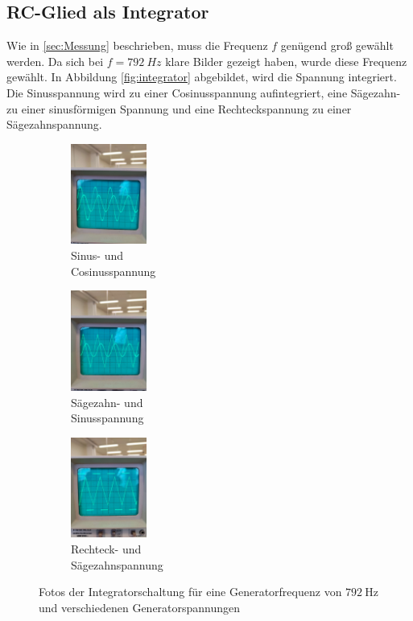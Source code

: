 \subsection{RC-Glied als Integrator}
Wie in \autoref{sec:Messung} beschrieben, muss die Frequenz $f$ genügend groß gewählt werden. Da sich bei $f = \SI{792}{Hz}$ klare Bilder gezeigt haben, wurde diese 
Frequenz gewählt. 
In Abbildung \autoref{fig:integrator} abgebildet, wird die Spannung integriert. Die Sinusspannung wird zu einer Cosinusspannung aufintegriert, eine Sägezahn- zu einer 
sinusförmigen Spannung und eine Rechteckspannung zu einer Sägezahnspannung.

\begin{figure}
    \centering
    \begin{subfigure}{0.3\textwidth}
        \centering
        \includegraphics[height=3.3cm]{img/sinus.jpg}
        \caption{Sinus- und \\ Cosinusspannung}
        \label{fig:sinus}
    \end{subfigure}
    \begin{subfigure}{0.3\textwidth}
        \centering
        \includegraphics[height=3.3cm]{img/saegezahn.jpg}
        \caption{Sägezahn- und \\ Sinusspannung}
        \label{fig:saegezahn}
    \end{subfigure}
    \begin{subfigure}{0.3\textwidth}
        \centering
        \includegraphics[height=3.3cm]{img/rechteck.jpg}
        \caption{Rechteck- und \\ Sägezahnspannung}
        \label{fig:rechteck}
    \end{subfigure}
    \caption{Fotos der Integratorschaltung für eine Generatorfrequenz von $\SI{792}{\hertz}$ und verschiedenen Generatorspannungen}
    \label{fig:integrator}
\end{figure}
\newpage